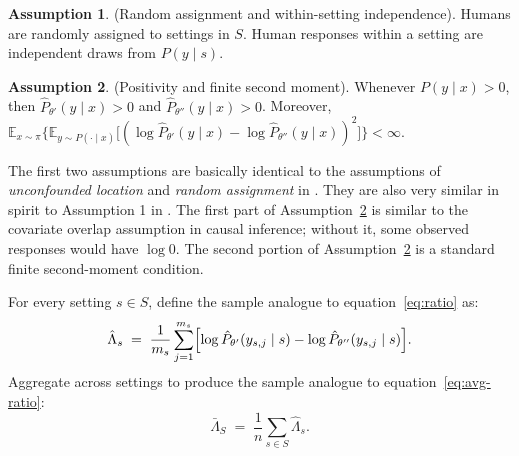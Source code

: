 \documentclass[11pt]{article}
\theoremstyle{definition}
\newtheorem{assumption}{Assumption}
\begin{document}
\begin{assumption}\label{ass:rand-humans}
(Random assignment and within-setting independence).
Humans are randomly assigned to settings in $S$.
Human responses within a setting are independent draws from $P(y \mid s)$.
\end{assumption}

\begin{assumption} \label{ass:response-support}
(Positivity and finite second moment).
Whenever $P(y\mid x)>0$, then $\hat P_{\theta'}(y\mid x)>0$ and $\hat P_{\theta''}(y\mid x)>0$. 
Moreover, $\mathbb{E}_{x\sim\pi}\bigl\{\mathbb{E}_{y\sim P(\cdot\mid x)}\bigl[(\log\hat P_{\theta'}(y\mid x) - \log\hat P_{\theta''}(y\mid x))^{2}\bigr]\bigr\} < \infty$.
\end{assumption}

The first two assumptions are basically identical to the assumptions of \emph{unconfounded location} and \emph{random assignment} in \citeauthor{Hotz2005PredictingEfficacy}.
They are also very similar in spirit to Assumption 1 in \citeauthor{andrews2025transfer}.
The first part of Assumption~\ref{ass:response-support} is similar to the covariate overlap assumption in causal inference; without it, some observed responses would have $\log 0$.
The second portion of Assumption~\ref{ass:response-support} is a standard finite second-moment condition.

For every setting $s \in S$, define the sample analogue to equation~\ref{eq:ratio} as:
\begin{equation} \label{eq:sample-ratio}
\hat\Lambda_{s}
\;=\;
\frac1{m_s}
\sum_{j=1}^{m_s}
\Bigl[\log\hat P_{\theta'}(y_{s,j}\mid s)
-\log\hat P_{\theta''}(y_{s,j}\mid s)\Bigr].
\end{equation}
Aggregate across settings to produce the sample analogue to equation~\ref{eq:avg-ratio}:
\begin{equation} \label{eq:sample-avg-ratio}
\bar\Lambda_{S}
\;=\;
\frac1n\sum_{s \in S}\hat\Lambda_{s}.
\end{equation}
\end{document}
